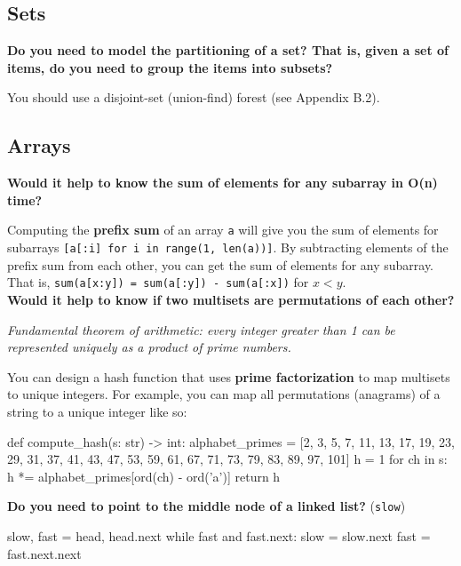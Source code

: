 \documentclass[12pt]{article}
\begin{document}
\subsection*{Sets}

\begin{adjustwidth}{2em}{0pt}
\textbf{Do you need to model the partitioning of a set? That is, given a set of items, do you need to group the items into subsets?} \medskip

You should use a disjoint-set (union-find) forest (see Appendix B.2).
\end{adjustwidth}

\subsection*{Arrays}

\begin{adjustwidth}{2em}{0pt}
\textbf{Would it help to know the sum of elements for any subarray in O(n) time?} \medskip

Computing the \textbf{prefix sum} of an array \texttt{a} will give you the sum of elements for subarrays \texttt{[a[:i] for i in range(1, len(a))]}. By subtracting elements of the prefix sum from each other, you can get the sum of elements for any subarray. That is, \texttt{sum(a[x:y]) = sum(a[:y]) - sum(a[:x])} for $x < y$. \\

\textbf{Would it help to know if two multisets are permutations of each other?} \medskip

\textit{Fundamental theorem of arithmetic: every integer greater than 1 can be represented uniquely as a product of prime numbers.} \medskip

You can design a hash function that uses \textbf{prime factorization} to map multisets to unique integers. For example, you can map all permutations (anagrams) of a string to a unique integer like so: \medskip

\begin{python}
def compute_hash(s: str) -> int:
    alphabet_primes = [2, 3, 5, 7, 11, 13, 17, 19, 23, 29,
                       31, 37, 41, 43, 47, 53, 59, 61, 67,
                       71, 73, 79, 83, 89, 97, 101]
    h = 1
    for ch in s:
        h *= alphabet_primes[ord(ch) - ord('a')]
    return h
\end{python} \bigskip

\textbf{Do you need to point to the middle node of a linked list?} (\texttt{slow})
\begin{python}
slow, fast = head, head.next
while fast and fast.next:
    slow = slow.next
    fast = fast.next.next
\end{python}

\end{adjustwidth}
\end{document}
